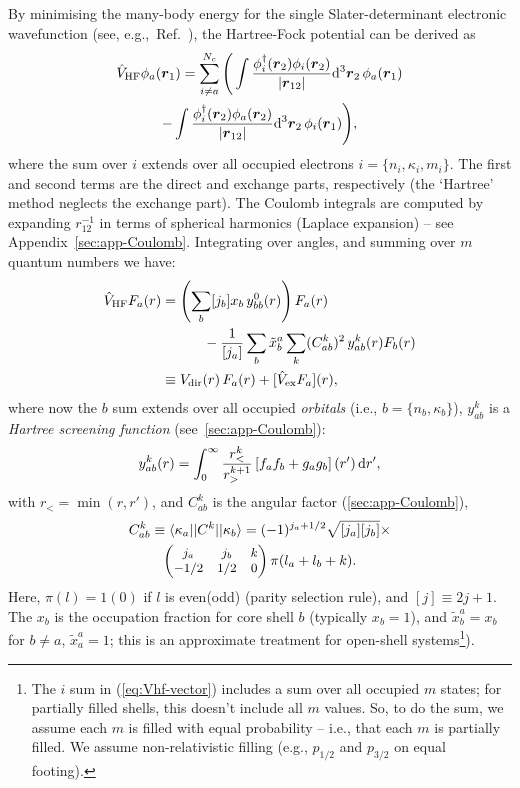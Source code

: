 \documentclass[10pt,twocolumn,a4paper]{article}%
\newcommand{\bra}[1]{\ensuremath{\langle #1|}}	%
\newcommand{\ket}[1]{\ensuremath{|#1\rangle}}	%
\newcommand{\threej}[6]{\small\ensuremath{\begin{pmatrix}#1&#2&#3\\#4&#5&#6\end{pmatrix}}}	%
\renewcommand{\v}[1]{\ensuremath{\boldsymbol{#1}}}		%
\newcommand{\be}{\begin{equation}}
\newcommand{\ee}{\end{equation}}
\def\d{\ensuremath{{\rm d}}}
\renewcommand{\k}{\ensuremath{\kappa}}
\begin{document}
By minimising the many-body energy for the single Slater-determinant electronic wavefunction (see, e.g.,~Ref.~\cite{JohnsonBook2007}), the Hartree-Fock potential can be derived as
\begin{multline}\label{eq:Vhf-vector}
\hat V_{\rm HF}\phi_a(\v{r}_1) = \sum_{i\neq a}^{N_c}\Bigg(
\int \frac{\phi_i^\dag(\v{r}_2)\phi_i(\v{r}_2)}{|\v{r}_{12}|}\d^3\v{r}_2\,\phi_a(\v{r}_1)\\
-\int \frac{\phi_i^\dag(\v{r}_2)\phi_a(\v{r}_2)}{|\v{r}_{12}|}\d^3\v{r}_2\,\phi_i(\v{r}_1)
\Bigg),
\end{multline}
where the sum over $i$ extends over all occupied electrons $i=\{n_i,\k_i,m_i\}$.
The first and second terms are the direct and exchange parts, respectively (the `Hartree' method neglects the exchange part).
The Coulomb integrals are computed by expanding ${r}_{12}^{-1}$ in terms of spherical harmonics (Laplace expansion) -- see Appendix~\ref{sec:app-Coulomb}.
Integrating over angles, and summing over $m$ quantum numbers we have:
\begin{align}
\label{eq:Vhf-radial}
\hat V_{\rm HF}F_a(r)& = \left(\sum_b [j_b] x_b  \,  y^0_{bb}(r)\right)F_a(r)
\notag \\  & \qquad\quad
-\frac{1}{[j_a]}\sum_b \tilde x_b^{a}\sum_k (C^k_{ab})^2\, y^k_{ab}(r) F_b(r)  \\
\label{eq:Vhf}
&\equiv V_{\rm dir}(r)\,F_a(r) + [\hat V_{\rm ex}F_a](r),
\end{align}
where now the $b$ sum extends over all occupied {\em orbitals} (i.e., $b=\{n_b,\k_b\}$),
$y_{ab}^k$ is a {\sl Hartree screening function} (see~\ref{sec:app-Coulomb}):
%
\be\label{eq:ykab}
y^k_{ab}(r) = \int_0^\infty \frac{r_<^k}{r_>^{k+1}}\left[f_a f_b + g_a g_b\right](r')\, \d r',
\ee
with $r_{<} = \min(r,r')$, and
$C^k_{ab}$ is the angular factor (\ref{sec:app-Coulomb}),
%
\begin{multline}\label{eq:Ckab}
C^k_{ab}\equiv\bra{\k_a}|C^k|\ket{\k_b} = (-1)^{j_a+1/2}\sqrt{[j_a][j_b]}\times\\\threej{j_a}{j_b}{k}{-1/2}{1/2}{0}\pi(l_a+l_b+k).
\end{multline}
Here, $\pi(l)=1(0)$ if $l$ is even(odd) (parity selection rule), and $[j]\equiv2j+1$. 
The $x_b$ is the occupation fraction for core shell $b$ (typically $x_b=1$), and
$\tilde x^a_b = x_b$ for $b\neq a$,  $\tilde x^a_a = 1$; this is an approximate treatment for open-shell systems\footnote{The $i$ sum in (\ref{eq:Vhf-vector}) includes a sum over all occupied $m$ states; for partially filled shells, this doesn't include all $m$ values. So, to do the sum, we assume each $m$ is filled with equal probability -- i.e., that each $m$ is partially filled. We assume non-relativistic filling (e.g., $p_{1/2}$ and $p_{3/2}$ on equal footing).}).
\end{document}
